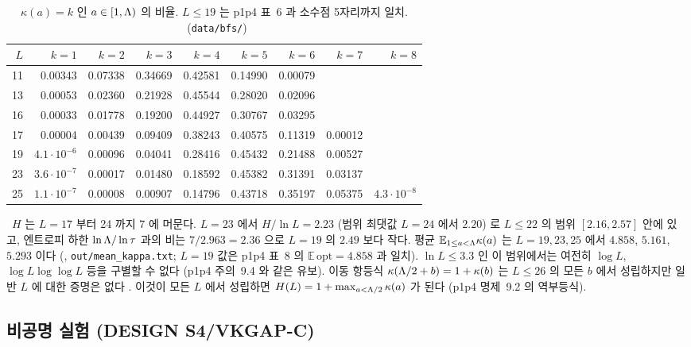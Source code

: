 \begin{table}[ht]\centering\small
\begin{tabular}{rrrrrrrrr}
\toprule
$L$ & $k=1$ & $k=2$ & $k=3$ & $k=4$ & $k=5$ & $k=6$ & $k=7$ & $k=8$\\
\midrule
11 & 0.00343 & 0.07338 & 0.34669 & 0.42581 & 0.14990 & 0.00079 &  & \\
13 & 0.00053 & 0.02360 & 0.21928 & 0.45544 & 0.28020 & 0.02096 &  & \\
16 & 0.00033 & 0.01778 & 0.19200 & 0.44927 & 0.30767 & 0.03295 &  & \\
17 & 0.00004 & 0.00439 & 0.09409 & 0.38243 & 0.40575 & 0.11319 & 0.00012 & \\
19 & $4.1\cdot10^{-6}$ & 0.00096 & 0.04041 & 0.28416 & 0.45432 & 0.21488 & 0.00527 & \\
23 & $3.6\cdot10^{-7}$ & 0.00017 & 0.01480 & 0.18592 & 0.45382 & 0.31391 & 0.03137 & \\
25 & $1.1\cdot10^{-7}$ & 0.00008 & 0.00907 & 0.14796 & 0.43718 & 0.35197 & 0.05375 & $4.3\cdot10^{-8}$\\
\bottomrule
\end{tabular}
\caption{$\kappa(a)=k$ 인 $a\in[1,\Lambda)$ 의 비율. $L\le 19$ 는 p1p4 표~6 과 소수점 5자리까지 일치. \NUMERIC\ (\texttt{data/bfs/})}\label{NUM:tab-frac}
\end{table}

\begin{remark}\label{NUM:rem-H-trend}
\HEUR\ $H$ 는 $L=17$ 부터 24 까지 $7$ 에 머문다. $L=23$ 에서 $H/\ln L=2.23$ (범위 최댓값 $L=24$ 에서 $2.20$) 로
$L\le22$ 의 범위 $[2.16,2.57]$ 안에 있고, 엔트로피 하한 $\ln\Lambda/\ln\tau$ 과의 비는 $7/2.963=2.36$ 으로 $L=19$ 의 $2.49$ 보다 작다.
평균 $\mathbb{E}_{1\le a<\Lambda}\kappa(a)$ 는 $L=19,23,25$ 에서 $4.858$, $5.161$, $5.293$ 이다 (\NUMERIC, \texttt{out/mean\_kappa.txt}; $L=19$ 값은 p1p4 표~8 의 $\mathbb{E}\,\mathrm{opt}=4.858$ 과 일치).
$\ln L\le 3.3$ 인 이 범위에서는 여전히 $\log L$, $\log L\log\log L$ 등을 구별할 수 없다 (p1p4 주의~9.4 와 같은 유보).
이동 항등식 $\kappa(\Lambda/2+b)=1+\kappa(b)$ 는 $L\le 26$ 의 모든 $b$ 에서 성립하지만 일반 $L$ 에 대한 증명은 없다 \OPEN.
이것이 모든 $L$ 에서 성립하면 $H(L)=1+\max_{a<\Lambda/2}\kappa(a)$ 가 된다 (p1p4 명제~9.2 의 역부등식).
\end{remark}

\subsection{비공명 실험 (DESIGN S4/VKGAP-C)}\label{NUM:ssec-res}

